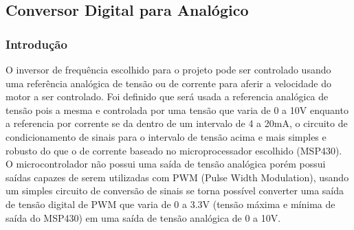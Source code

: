 \subsection{Conversor Digital para Analógico}
\subsubsection{Introdução}
O inversor de frequência escolhido para o projeto pode ser controlado usando uma referência analógica de tensão ou de corrente para aferir a velocidade do motor a ser controlado. Foi definido que será usada a referencia analógica de tensão pois a mesma e controlada por uma tensão que varia de 0 a 10V enquanto a referencia por corrente se da dentro de um intervalo de 4 a 20mA, o circuito de condicionamento de sinais para o intervalo de tensão acima e mais simples e robusto do que o de corrente baseado no microprocessador escolhido (MSP430). O microcontrolador não possui uma saída de tensão analógica porém possui saídas capazes de serem utilizadas com PWM (Pulse Width Modulation), usando um simples circuito de conversão de sinais se torna possível converter uma saída de tensão digital de PWM que varia de 0 a 3.3V (tensão máxima e mínima de saída do MSP430) em uma saída de tensão analógica de 0 a 10V.
